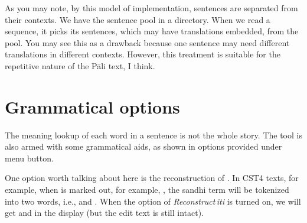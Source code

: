 As you may note, by this model of implementation, sentences are separated from their contexts. We have the sentence pool in a directory. When we read a sequence, it picks its sentences, which may have translations embedded, from the pool. You may see this as a drawback because one sentence may need different translations in different contexts. However, this treatment is suitable for the repetitive nature of the Pāli text, I think.


\section{Grammatical options}

The meaning lookup of each word in a sentence is not the whole story. The tool is also armed with some grammatical aids, as shown in options provided under {\faSix {}} menu button. 

One option worth talking about here is the reconstruction of . In CST4 texts, for example, when  is marked out, for example, , the sandhi term will be tokenized into two words, i.e.,  and . When the option of \emph{Reconstruct\,iti} is turned on, we will get  and  in the display (but the edit text is still intact).

